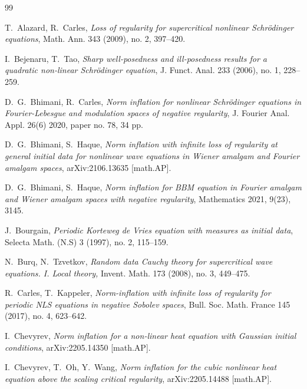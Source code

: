 \documentclass[letterpaper, 11pt,  reqno]{amsart}
\newcommand{\1}{\hspace{0.5mm}\text{I}\hspace{0.5mm}}
\numberwithin{equation}{section}
\numberwithin{theorem}{section}
\begin{document}
\begin{thebibliography}{99}


T.~Alazard, R.~Carles,
{\it Loss of regularity for supercritical nonlinear Schrödinger equations},
Math. Ann. 343 (2009), no. 2, 397–420.

I.~Bejenaru, T.~Tao,
{\it Sharp well-posedness and ill-posedness results for a quadratic non-linear Schrödinger equation},
J. Funct. Anal. 233 (2006), no. 1, 228–259.

D.~G.~Bhimani, R.~Carles,
{\it Norm inflation for nonlinear Schr\"odinger equations in Fourier-Lebesgue and modulation spaces of negative regularity},
J. Fourier Anal. Appl. 26(6) 2020, paper no. 78, 34 pp.

D.~G.~Bhimani, S.~Haque,
{\it Norm inflation with infinite loss of regularity at general initial data for nonlinear wave equations in Wiener amalgam and Fourier amalgam spaces},
arXiv:2106.13635 [math.AP].

D.~G.~Bhimani, S.~Haque,
{\it Norm inflation for BBM equation in Fourier amalgam and Wiener amalgam spaces with negative regularity},
Mathematics 2021, 9(23), 3145.

J.~Bourgain,
{\it Periodic Korteweg de Vries equation with measures as initial data}, 
Selecta Math. (N.S) 3 (1997), no. 2, 115--159.

N.~Burq, N.~Tzvetkov,
{\it Random data Cauchy theory for supercritical wave equations. I. Local theory,}
Invent. Math. 173 (2008), no. 3, 449--475.



R.~Carles, T.~Kappeler, 
{\it Norm-inflation with infinite loss of regularity for periodic NLS equations in negative Sobolev spaces},
Bull. Soc. Math. France 145 (2017), no. 4, 623–642.

I.~Chevyrev,
{\it Norm inflation for a non-linear heat equation with Gaussian initial conditions},
arXiv:2205.14350 [math.AP].

I.~Chevyrev, T.~Oh, Y.~Wang,
{\it Norm inflation for the cubic nonlinear heat equation above the scaling critical regularity},
arXiv:2205.14488 [math.AP].


\end{thebibliography}
\end{document}
